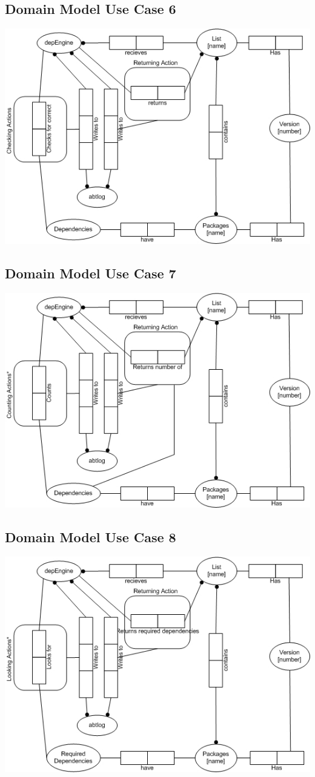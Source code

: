 \subsection{Domain Model Use Case 6}
\includegraphics{dms/ORM006.jpg}
\subsection{Domain Model Use Case 7}
\includegraphics{dms/ORM007.jpg}
\subsection{Domain Model Use Case 8}
\includegraphics{dms/ORM008.jpg}
